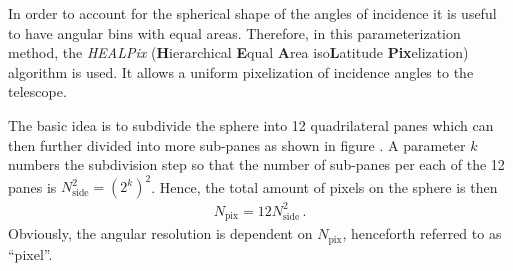 In order to account for the spherical shape of the angles of incidence it is useful to have angular bins with equal areas. Therefore, in this parameterization method, the \textit{HEALPix} (\textbf{H}ierarchical \textbf{E}qual \textbf{A}rea iso\textbf{L}atitude \textbf{Pix}elization) algorithm is used. It allows a uniform pixelization of incidence angles to the telescope.\\


The basic idea is to subdivide the sphere into 12 quadrilateral panes which can then further divided into more sub-panes as shown in figure . A parameter $k$ numbers the subdivision step so that the number of sub-panes per each of the 12 panes is $N_{\text{side}}^2=\left(2^k\right)^2$. Hence, the total amount of pixels on the sphere is then
\begin{align}
N_\text{pix} = 12N_\text{side}^2\,.
\end{align}
Obviously, the angular resolution is dependent on $N_\text{pix}$, henceforth referred to as \enquote{pixel}.

